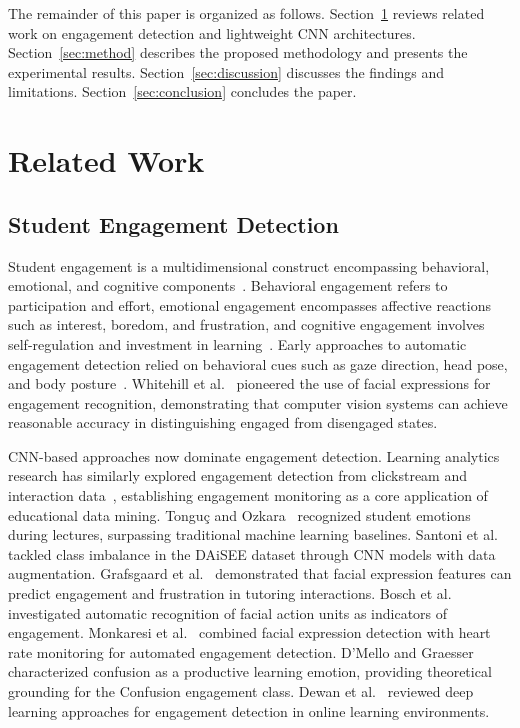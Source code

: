 \documentclass[sensors,article,submit,pdftex,moreauthors]{Definitions/mdpi}
\begin{document}
The remainder of this paper is organized as follows. Section~\ref{sec:related} reviews related work on engagement detection and lightweight CNN architectures. Section~\ref{sec:method} describes the proposed methodology and presents the experimental results. Section~\ref{sec:discussion} discusses the findings and limitations. Section~\ref{sec:conclusion} concludes the paper.

\section{Related Work}
\label{sec:related}

\subsection{Student Engagement Detection}

Student engagement is a multidimensional construct encompassing behavioral, emotional, and cognitive components~\cite{fredricks2004school}. Behavioral engagement refers to participation and effort, emotional engagement encompasses affective reactions such as interest, boredom, and frustration, and cognitive engagement involves self-regulation and investment in learning~\cite{skinner2009motivational}. Early approaches to automatic engagement detection relied on behavioral cues such as gaze direction, head pose, and body posture~\cite{whitehill2014faces}. Whitehill et al.~\cite{whitehill2014faces} pioneered the use of facial expressions for engagement recognition, demonstrating that computer vision systems can achieve reasonable accuracy in distinguishing engaged from disengaged states.

CNN-based approaches now dominate engagement detection. Learning analytics research has similarly explored engagement detection from clickstream and interaction data~\cite{baker2014educational}, establishing engagement monitoring as a core application of educational data mining. Tongu\c{c} and Ozkara~\cite{tonguc2020automatic} recognized student emotions during lectures, surpassing traditional machine learning baselines. Santoni et al.~\cite{santoni2023cnn} tackled class imbalance in the DAiSEE dataset through CNN models with data augmentation. Grafsgaard et al.~\cite{grafsgaard2013automatically} demonstrated that facial expression features can predict engagement and frustration in tutoring interactions. Bosch et al.~\cite{bosch2015automatic} investigated automatic recognition of facial action units as indicators of engagement. Monkaresi et al.~\cite{monkaresi2017automated} combined facial expression detection with heart rate monitoring for automated engagement detection. D'Mello and Graesser~\cite{dmello2012auto} characterized confusion as a productive learning emotion, providing theoretical grounding for the Confusion engagement class. Dewan et al.~\cite{dewan2019deep} reviewed deep learning approaches for engagement detection in online learning environments.
\end{document}
